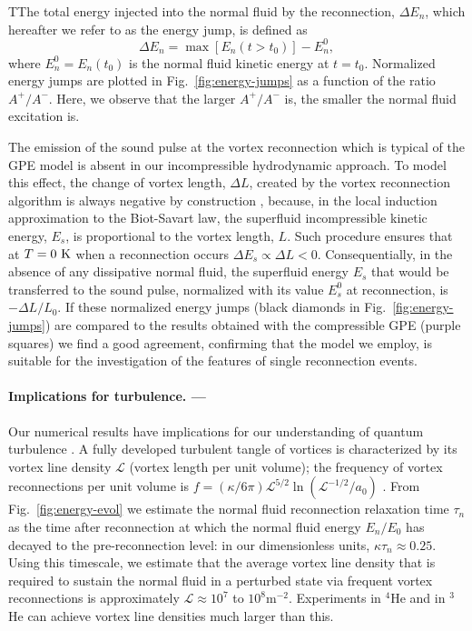\documentclass[
  reprint,
superscriptaddress,
 amsmath,amssymb,
 aps,
prb,
]{revtex4-2}
\begin{document}
TThe total energy injected into the normal fluid by the reconnection,
$\Delta E_n$, which hereafter
we refer to as the energy jump, is defined as
\begin{equation}
	\Delta E_n = \max{\left[E_n(t>t_0)\right]} - E_n^0,
\end{equation} 
%
where $E_n^0=E_n(t_0)$ is the normal fluid kinetic energy at $t=t_0$.
Normalized energy jumps are plotted in
Fig.~\ref{fig:energy-jumps} as a function of
the ratio $A^+/A^-$. Here, we observe that the larger $A^+/A^-$ is,
the smaller the normal fluid excitation is.

The emission of the sound pulse at the vortex reconnection 
\cite{leadbeaterSoundEmissionDue2001b} which is typical of the GPE model
is absent in our incompressible hydrodynamic approach. To model
this effect, the change of vortex length, $\Delta L$, created by the
vortex reconnection algorithm is always negative by construction
\cite{baggaleySensitivityVortexFilament2012a},
because, in the local induction approximation to the Biot-Savart law, 
the superfluid incompressible kinetic energy, $E_s$, is proportional to the vortex length,
$L$. Such procedure ensures that at $T=0~{\rm K}$ when a reconnection occurs
$\Delta E_s\propto \Delta L < 0$.
Consequentially, in the absence of any dissipative normal fluid, 
the superfluid energy 
$E_s$ that would be transferred to the sound pulse, normalized with its value $E_s^0$ at 
reconnection, is $-\Delta L/L_0$. 
If these normalized energy jumps (black diamonds
in Fig.~\ref{fig:energy-jumps}) are compared to the results obtained with the 
compressible GPE \cite{villoisIrreversibleDynamicsVortex2020} (purple squares)
we find a good agreement, confirming that the model we employ, 
is suitable for the investigation of the features of single reconnection events.

\paragraph*{Implications for turbulence. ---}
Our numerical results have implications for our understanding of 
quantum turbulence \cite{BSS2023}.
A fully developed turbulent tangle of vortices is
characterized by its vortex line density $\mathcal{L}$ (vortex length
per unit volume); the frequency 
of vortex reconnections per unit volume is 
${f=(\kappa/6\pi)\mathcal{L}^{5/2}\ln(\mathcal{L}^{-1/2}/a_0)}$
\cite{barenghi2004}. From Fig.~\ref{fig:energy-evol} we estimate the 
normal fluid reconnection relaxation time $\tau_n$ as the time 
after reconnection at which the normal fluid energy $E_n/E_0$ has decayed
to the pre-reconnection level: in our dimensionless units, $\kappa \tau_n \approx 0.25$. 
Using this timescale, we estimate that
the average vortex line density that is required to sustain the normal fluid 
in a perturbed state via frequent vortex reconnections is approximately
$\mathcal{L} \approx 10^7$ to $10^8\mathrm{m}^{-2}$. 
Experiments in $^4$He
\cite{schwarz1981,milliken1982,roche2008,roche2007,Babuin2014} and in $^3$He
\cite{bradley2006} can achieve vortex line densities much larger than this.
\end{document}
